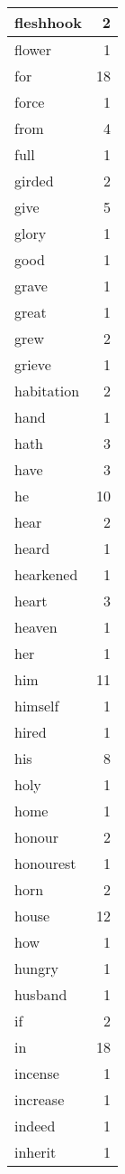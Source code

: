 \begin{center}
\begin{longtable}{l|r}
fleshhook & 2 \\ \hline
flower & 1 \\ \hline
for & 18 \\ \hline
force & 1 \\ \hline
from & 4 \\ \hline
full & 1 \\ \hline
girded & 2 \\ \hline
give & 5 \\ \hline
glory & 1 \\ \hline
good & 1 \\ \hline
grave & 1 \\ \hline
great & 1 \\ \hline
grew & 2 \\ \hline
grieve & 1 \\ \hline
habitation & 2 \\ \hline
hand & 1 \\ \hline
hath & 3 \\ \hline
have & 3 \\ \hline
he & 10 \\ \hline
hear & 2 \\ \hline
heard & 1 \\ \hline
hearkened & 1 \\ \hline
heart & 3 \\ \hline
heaven & 1 \\ \hline
her & 1 \\ \hline
him & 11 \\ \hline
himself & 1 \\ \hline
hired & 1 \\ \hline
his & 8 \\ \hline
holy & 1 \\ \hline
home & 1 \\ \hline
honour & 2 \\ \hline
honourest & 1 \\ \hline
horn & 2 \\ \hline
house & 12 \\ \hline
how & 1 \\ \hline
hungry & 1 \\ \hline
husband & 1 \\ \hline
if & 2 \\ \hline
in & 18 \\ \hline
incense & 1 \\ \hline
increase & 1 \\ \hline
indeed & 1 \\ \hline
inherit & 1 \\ \hline

\end{longtable}
\end{center}
